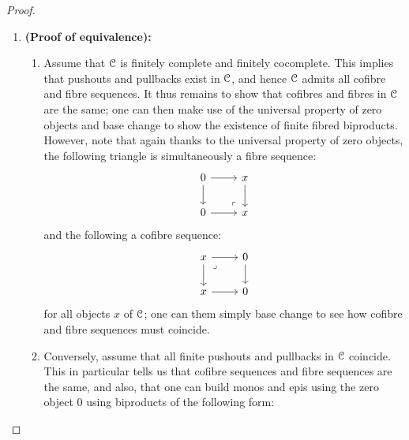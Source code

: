 \begin{proof}
                \begin{enumerate}
                    \item \textbf{(Proof of equivalence):} 
                        \begin{enumerate}
                            \item Assume that $\mathcal{C}$ is finitely complete and finitely cocomplete. This implies that pushouts and pullbacks exist in $\mathcal{C}$, and hence $\mathcal{C}$ admits all cofibre and fibre sequences. It thus remains to show that cofibres and fibres in $\mathcal{C}$ are the same; one can then make use of the universal property of zero objects and base change to show the existence of finite fibred biproducts. However, note that again thanks to the universal property of zero objects, the following triangle is simultaneously a fibre sequence:
                                $$
                                    \begin{tikzcd}
                                        0 & x \\
                                        0 & x
                                        \arrow[from=1-1, to=2-1]
                                        \arrow[from=1-2, to=2-2]
                                        \arrow[from=2-1, to=2-2]
                                        \arrow[from=1-1, to=1-2]
                                        \arrow["\lrcorner"{anchor=center, pos=0.125, rotate=180}, draw=none, from=2-2, to=1-1]
                                    \end{tikzcd}
                                $$
                            and the following a cofibre sequence:
                                $$
                                    \begin{tikzcd}
                                        x & 0 \\
                                        x & 0
                                        \arrow[from=1-2, to=2-2]
                                        \arrow[from=2-1, to=2-2]
                                        \arrow[from=1-1, to=2-1]
                                        \arrow[from=1-1, to=1-2]
                                        \arrow["\lrcorner"{anchor=center, pos=0.125}, draw=none, from=1-1, to=2-2]
                                    \end{tikzcd}
                                $$
                            for all objects $x$ of $\mathcal{C}$; one can them simply base change to see how cofibre and fibre sequences must coincide.
                            \item Conversely, assume that all finite pushouts and pullbacks in $\mathcal{C}$ coincide. This in particular tells us that cofibre sequences and fibre sequences are the same, and also, that one can build monos and epis using the zero object $0$ using biproducts of the following form:

\end{enumerate}
\end{enumerate}
\end{proof}
